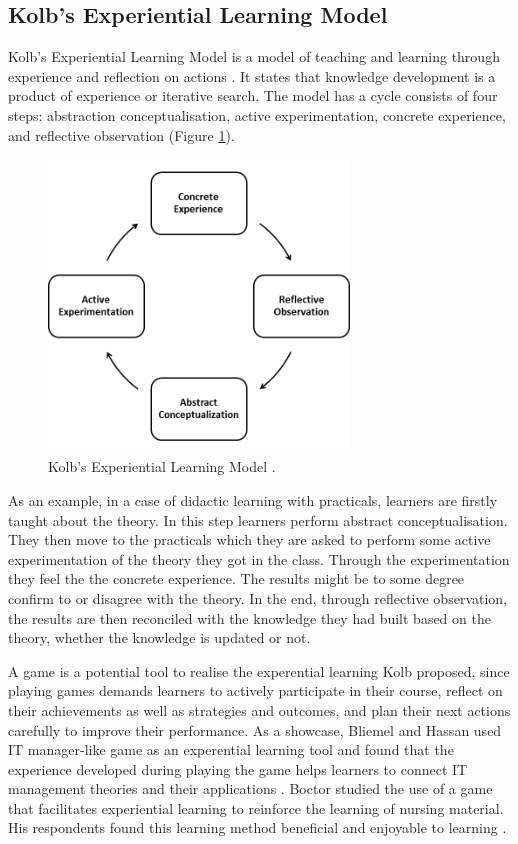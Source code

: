 \documentclass[12pt, a4paper]{report}
\begin{document}
\subsection{Kolb's Experiential Learning Model}
Kolb's Experiential Learning Model is a model of teaching and learning through experience and reflection on actions \cite{kolb2014experiential}. It states that knowledge development is a product of experience or iterative search. The model has a cycle consists of four steps: abstraction conceptualisation, active experimentation, concrete experience, and reflective observation (Figure \ref{kolb}). 

\begin{figure}[ht]
\centering
\includegraphics[width=8cm]{kolb}
\caption{Kolb's Experiential Learning Model \cite{kolb2014experiential}.}
\label{kolb}
\end{figure}

As an example, in a case of didactic learning with practicals, learners are firstly taught about the theory. In this step learners perform abstract conceptualisation. They then move to the practicals which they are asked to perform some active experimentation of the theory they got in the class. Through the experimentation they feel the the concrete experience. The results might be to some degree confirm to or disagree with the theory. In the end, through reflective observation, the results are then reconciled with the knowledge they had built based on the theory, whether the knowledge is updated or not. 

A game is a potential tool to realise the experential learning Kolb proposed, since playing games demands learners to actively participate in their course, reflect on their achievements as well as strategies and outcomes, and plan their next actions carefully to improve their performance. As a showcase, Bliemel and Hassan used IT manager-like game as  an experential learning tool and found that the experience developed during playing the game helps learners to connect IT management theories and their applications \cite{bliemel2014game}. Boctor studied the use of a game that facilitates experiential learning to reinforce the learning of nursing material. His respondents found this learning method beneficial and enjoyable to learning \cite{boctor2013active}. 
\end{document}
